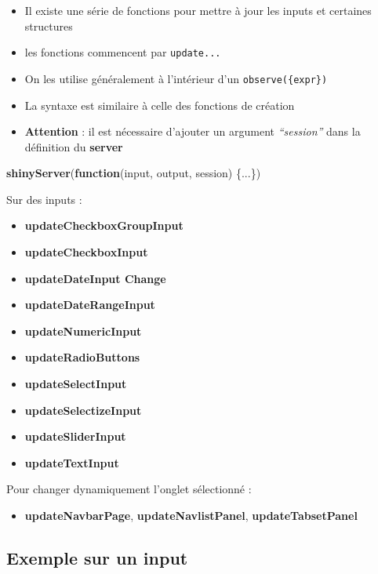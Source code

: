 \documentclass[]{article}
\newenvironment{Shaded}{\begin{snugshade}}{\end{snugshade}}
\newcommand{\KeywordTok}[1]{\textcolor[rgb]{0.13,0.29,0.53}{\textbf{#1}}}
\newcommand{\ControlFlowTok}[1]{\textcolor[rgb]{0.13,0.29,0.53}{\textbf{#1}}}
\newcommand{\NormalTok}[1]{#1}
\providecommand{\tightlist}{%
  \setlength{\itemsep}{0pt}\setlength{\parskip}{0pt}}
\begin{document}
\begin{itemize}
\item
  Il existe une série de fonctions pour mettre à jour les inputs et
  certaines structures
\item
  les fonctions commencent par \texttt{update...}
\item
  On les utilise généralement à l'intérieur d'un
  \texttt{observe(\{expr\})}
\item
  La syntaxe est similaire à celle des fonctions de création
\item
  \textbf{Attention} : il est nécessaire d'ajouter un argument
  \emph{``session''} dans la définition du \textbf{server}
\end{itemize}

\begin{Shaded}
\begin{Highlighting}[]
\KeywordTok{shinyServer}\NormalTok{(}\ControlFlowTok{function}\NormalTok{(input, output, session) \{...\})}
\end{Highlighting}
\end{Shaded}

Sur des inputs :

\begin{itemize}
\tightlist
\item
  \textbf{updateCheckboxGroupInput}
\item
  \textbf{updateCheckboxInput}
\item
  \textbf{updateDateInput Change}
\item
  \textbf{updateDateRangeInput}
\item
  \textbf{updateNumericInput}
\item
  \textbf{updateRadioButtons}
\item
  \textbf{updateSelectInput}
\item
  \textbf{updateSelectizeInput}
\item
  \textbf{updateSliderInput}
\item
  \textbf{updateTextInput}
\end{itemize}

Pour changer dynamiquement l'onglet sélectionné :

\begin{itemize}
\tightlist
\item
  \textbf{updateNavbarPage}, \textbf{updateNavlistPanel},
  \textbf{updateTabsetPanel}
\end{itemize}

\subsection{Exemple sur un input}\label{exemple-sur-un-input}
\end{document}
